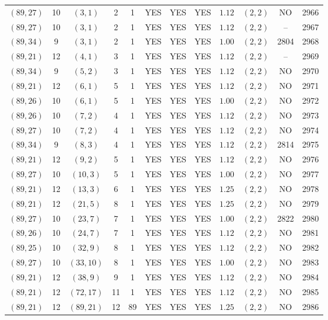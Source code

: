 \begin{longtable}{|c|c|c|c|c|c|c|c|c|c|c|c|}
$(89,27)$ & 10 & $(3,1)$ & 2 & 1 & YES & YES & YES & $1.12$ & $(2,2)$ & NO & 2966\\
$(89,27)$ & 10 & $(3,1)$ & 2 & 1 & YES & YES & YES & $1.12$ & $(2,2)$ & -- & 2967\\
$(89,34)$ & 9 & $(3,1)$ & 2 & 1 & YES & YES & YES & $1.00$ & $(2,2)$ & 2804 & 2968\\
$(89,21)$ & 12 & $(4,1)$ & 3 & 1 & YES & YES & YES & $1.12$ & $(2,2)$ & -- & 2969\\
$(89,34)$ & 9 & $(5,2)$ & 3 & 1 & YES & YES & YES & $1.12$ & $(2,2)$ & NO & 2970\\
$(89,21)$ & 12 & $(6,1)$ & 5 & 1 & YES & YES & YES & $1.12$ & $(2,2)$ & NO & 2971\\
$(89,26)$ & 10 & $(6,1)$ & 5 & 1 & YES & YES & YES & $1.00$ & $(2,2)$ & NO & 2972\\
$(89,26)$ & 10 & $(7,2)$ & 4 & 1 & YES & YES & YES & $1.12$ & $(2,2)$ & NO & 2973\\
$(89,27)$ & 10 & $(7,2)$ & 4 & 1 & YES & YES & YES & $1.12$ & $(2,2)$ & NO & 2974\\
$(89,34)$ & 9 & $(8,3)$ & 4 & 1 & YES & YES & YES & $1.12$ & $(2,2)$ & 2814 & 2975\\
$(89,21)$ & 12 & $(9,2)$ & 5 & 1 & YES & YES & YES & $1.12$ & $(2,2)$ & NO & 2976\\
$(89,27)$ & 10 & $(10,3)$ & 5 & 1 & YES & YES & YES & $1.00$ & $(2,2)$ & NO & 2977\\
$(89,21)$ & 12 & $(13,3)$ & 6 & 1 & YES & YES & YES & $1.25$ & $(2,2)$ & NO & 2978\\
$(89,21)$ & 12 & $(21,5)$ & 8 & 1 & YES & YES & YES & $1.25$ & $(2,2)$ & NO & 2979\\
$(89,27)$ & 10 & $(23,7)$ & 7 & 1 & YES & YES & YES & $1.00$ & $(2,2)$ & 2822 & 2980\\
$(89,26)$ & 10 & $(24,7)$ & 7 & 1 & YES & YES & YES & $1.12$ & $(2,2)$ & NO & 2981\\
$(89,25)$ & 10 & $(32,9)$ & 8 & 1 & YES & YES & YES & $1.12$ & $(2,2)$ & NO & 2982\\
$(89,27)$ & 10 & $(33,10)$ & 8 & 1 & YES & YES & YES & $1.00$ & $(2,2)$ & NO & 2983\\
$(89,21)$ & 12 & $(38,9)$ & 9 & 1 & YES & YES & YES & $1.12$ & $(2,2)$ & NO & 2984\\
$(89,21)$ & 12 & $(72,17)$ & 11 & 1 & YES & YES & YES & $1.12$ & $(2,2)$ & NO & 2985\\
$(89,21)$ & 12 & $(89,21)$ & 12 & 89 & YES & YES & YES & $1.25$ & $(2,2)$ & NO & 2986\\

\end{longtable}
